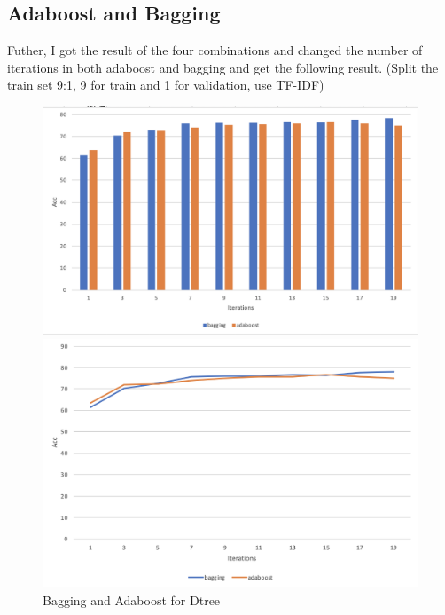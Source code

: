 \documentclass[paper=a4, fontsize=11pt, UTF8]{article} %
\begin{document}
\subsection{Adaboost and Bagging}
Futher, I got the result of the four combinations and changed the number of iterations in both adaboost and bagging and get the following result.
(Split the train set 9:1, 9 for train and 1 for validation, use TF-IDF)
\begin{figure}[H]
	\centering %
	\begin{minipage}[b]{0.45\textwidth} %
		\centering %
		\includegraphics[scale=0.3]{./photos/dtree1.png} %
	\end{minipage}
	\begin{minipage}[b]{0.45\textwidth} %
		\centering %
		\includegraphics[scale=0.3]{./photos/dtree2.png}%
    \end{minipage}
    \caption{Bagging and Adaboost for Dtree}
    \label{dtree}
\end{figure}
\end{document}
